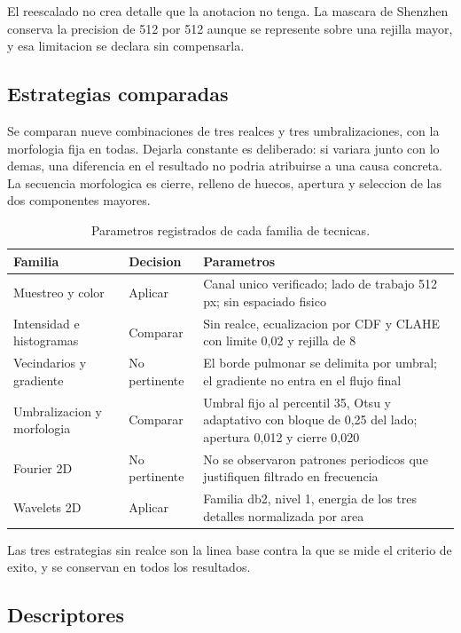 \documentclass[11pt,a4paper]{article}
\begin{document}
El reescalado no crea detalle que la anotacion no tenga. La mascara de
Shenzhen conserva la precision de 512 por 512 aunque se represente sobre una
rejilla mayor, y esa limitacion se declara sin compensarla.

\subsection{Estrategias comparadas}

Se comparan nueve combinaciones de tres realces y tres umbralizaciones, con la
morfologia fija en todas. Dejarla constante es deliberado: si variara junto
con lo demas, una diferencia en el resultado no podria atribuirse a una causa
concreta. La secuencia morfologica es cierre, relleno de huecos, apertura y
seleccion de las dos componentes mayores.

\begin{table}[H]
\centering
\small
\caption{Parametros registrados de cada familia de tecnicas.}
\begin{tabular}{@{}p{3.6cm}p{4.2cm}p{6.4cm}@{}}
\toprule
\textbf{Familia} & \textbf{Decision} & \textbf{Parametros} \\
\midrule
Muestreo y color & Aplicar & Canal unico verificado; lado de trabajo 512 px; sin espaciado fisico \\
\addlinespace
Intensidad e histogramas & Comparar & Sin realce, ecualizacion por CDF y CLAHE con limite 0,02 y rejilla de 8 \\
\addlinespace
Vecindarios y gradiente & No pertinente & El borde pulmonar se delimita por umbral; el gradiente no entra en el flujo final \\
\addlinespace
Umbralizacion y morfologia & Comparar & Umbral fijo al percentil 35, Otsu y adaptativo con bloque de 0,25 del lado; apertura 0,012 y cierre 0,020 \\
\addlinespace
Fourier 2D & No pertinente & No se observaron patrones periodicos que justifiquen filtrado en frecuencia \\
\addlinespace
Wavelets 2D & Aplicar & Familia db2, nivel 1, energia de los tres detalles normalizada por area \\
\bottomrule
\end{tabular}
\end{table}

Las tres estrategias sin realce son la linea base contra la que se mide el
criterio de exito, y se conservan en todos los resultados.

\subsection{Descriptores}
\end{document}
